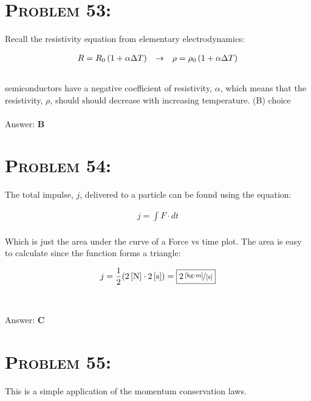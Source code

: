 \documentclass{article}
\begin{document}

\section{\textsc{Problem 53:}} Recall the resistivity equation from elementary electrodynamics:

\begin{gather}
R = R_{0}  \left( 1 + \alpha \Delta T  \right) \hspace{.1in} \rightarrow \hspace{.1in} \rho = \rho_{0}  \left( 1 + \alpha \Delta T  \right)
\end{gather}
\\
semiconductors have a negative coefficient of resistivity, $\alpha$, which means that the resistivity, $\rho$, should should decrease with increasing temperature. (B) choice
\\\\
Answer: \textbf{\textcolor{ProcessBlue}B}\\


\section{\textsc{Problem 54:}} The total impulse, $j$, delivered to a particle can be found using the equation:

\begin{gather}
j = \int{F \cdot dt}
\end{gather}
\\
Which is just the area under the curve of a Force vs time plot. The area is easy to calculate since the function forms a triangle:

\begin{gather}
j = \frac{1}{2}(\unit[2]{[N]} \cdot \unit[2]{[s]}) = \boxed{\unitfrac[2]{[kg \cdot m]}{[s]}}\nonumber
\end{gather}
\\\\
Answer: \textbf{\textcolor{ProcessBlue}C}\\


\section{\textsc{Problem 55:}} This is a simple application of the momentum conservation laws.
\end{document}
